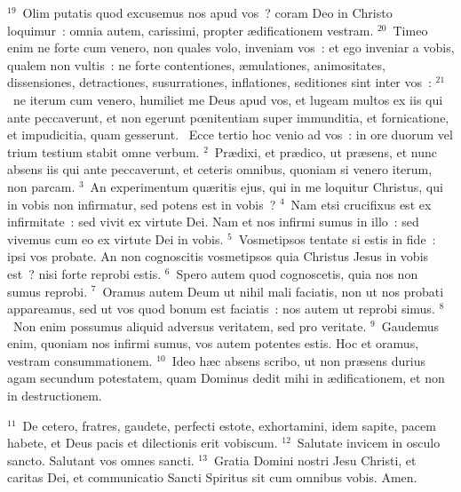 ${}^{19}$~Olim putatis quod excusemus nos apud vos~? coram Deo in Christo loquimur~: omnia autem, carissimi, propter \ae dificationem vestram.
${}^{20}$~Timeo enim ne forte cum venero, non quales volo, inveniam vos~: et ego inveniar a vobis, qualem non vultis~: ne forte contentiones, \ae mulationes, animositates, dissensiones, detractiones, susurrationes, inflationes, seditiones sint inter vos~:
${}^{21}$~ne iterum cum venero, humiliet me Deus apud vos, et lugeam multos ex iis qui ante peccaverunt, et non egerunt pœnitentiam super immunditia, et fornicatione, et impudicitia, quam gesserunt.
~Ecce tertio hoc venio ad vos~: in ore duorum vel trium testium stabit omne verbum.
${}^{2}$~Pr\ae dixi, et pr\ae dico, ut pr\ae sens, et nunc absens iis qui ante peccaverunt, et ceteris omnibus, quoniam si venero iterum, non parcam.
${}^{3}$~An experimentum qu\ae ritis ejus, qui in me loquitur Christus, qui in vobis non infirmatur, sed potens est in vobis~?
${}^{4}$~Nam etsi crucifixus est ex infirmitate~: sed vivit ex virtute Dei. Nam et nos infirmi sumus in illo~: sed vivemus cum eo ex virtute Dei in vobis.
${}^{5}$~Vosmetipsos tentate si estis in fide~: ipsi vos probate. An non cognoscitis vosmetipsos quia Christus Jesus in vobis est~? nisi forte reprobi estis.
${}^{6}$~Spero autem quod cognoscetis, quia nos non sumus reprobi.
${}^{7}$~Oramus autem Deum ut nihil mali faciatis, non ut nos probati appareamus, sed ut vos quod bonum est faciatis~: nos autem ut reprobi simus.
${}^{8}$~Non enim possumus aliquid adversus veritatem, sed pro veritate.
${}^{9}$~Gaudemus enim, quoniam nos infirmi sumus, vos autem potentes estis. Hoc et oramus, vestram consummationem.
${}^{10}$~Ideo h\ae c absens scribo, ut non pr\ae sens durius agam secundum potestatem, quam Dominus dedit mihi in \ae dificationem, et non in destructionem.


${}^{11}$~De cetero, fratres, gaudete, perfecti estote, exhortamini, idem sapite, pacem habete, et Deus pacis et dilectionis erit vobiscum.
${}^{12}$~Salutate invicem in osculo sancto. Salutant vos omnes sancti.
${}^{13}$~Gratia Domini nostri Jesu Christi, et caritas Dei, et communicatio Sancti Spiritus sit cum omnibus vobis. Amen.
